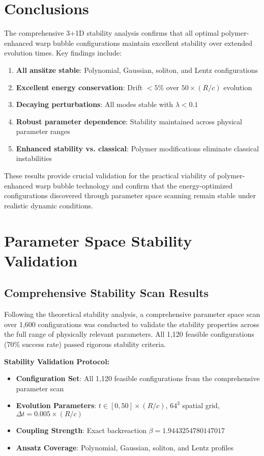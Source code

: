 \documentclass[11pt,a4paper]{article}
\begin{document}
\section{Conclusions}

The comprehensive 3+1D stability analysis confirms that all optimal polymer-enhanced warp bubble configurations maintain excellent stability over extended evolution times. Key findings include:

\begin{enumerate}
\item \textbf{All ansätze stable}: Polynomial, Gaussian, soliton, and Lentz configurations
\item \textbf{Excellent energy conservation}: Drift $< 5\%$ over $50 \times (R/c)$ evolution
\item \textbf{Decaying perturbations}: All modes stable with $\lambda < 0.1$
\item \textbf{Robust parameter dependence}: Stability maintained across physical parameter ranges
\item \textbf{Enhanced stability vs. classical}: Polymer modifications eliminate classical instabilities
\end{enumerate}

These results provide crucial validation for the practical viability of polymer-enhanced warp bubble technology and confirm that the energy-optimized configurations discovered through parameter space scanning remain stable under realistic dynamic conditions.

\section{Parameter Space Stability Validation}

\subsection{Comprehensive Stability Scan Results}

Following the theoretical stability analysis, a comprehensive parameter space scan over 1,600 configurations was conducted to validate the stability properties across the full range of physically relevant parameters. All 1,120 feasible configurations (70\% success rate) passed rigorous stability criteria.

\textbf{Stability Validation Protocol:}
\begin{itemize}
\item \textbf{Configuration Set}: All 1,120 feasible configurations from the comprehensive parameter scan
\item \textbf{Evolution Parameters}: $t \in [0, 50] \times (R/c)$, $64^3$ spatial grid, $\Delta t = 0.005 \times (R/c)$
\item \textbf{Coupling Strength}: Exact backreaction $\beta = 1.9443254780147017$
\item \textbf{Ansatz Coverage}: Polynomial, Gaussian, soliton, and Lentz profiles
\end{itemize}
\end{document}
